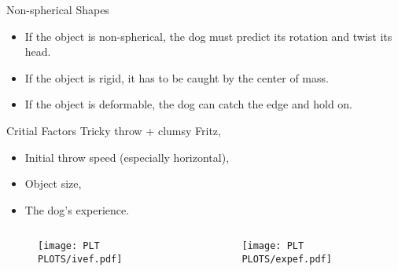 \documentclass[compress,12pt,mp]{beamer}
\begin{document}
\begin{frame}[t]{Non-spherical Shapes}
\begin{itemize}
\item If the object is non-spherical, the dog must predict its rotation and twist its head.
\item If the object is rigid, it has to be caught by the center of mass.
\item If the object is deformable, the dog can catch the edge and hold on.
\end{itemize}
\end{frame}
\begin{frame}[t]{Critial Factors}
Tricky throw + clumsy Fritz,

\begin{itemize}
\item Initial throw speed (especially horizontal),
\item Object size,
\item The dog's experience.
\end{itemize}
\begin{columns}
    \begin{column}{0.48\textwidth}
        \vspace{1cm}
        \begin{figure}
            \centering
            \texttt{[image: PLT PLOTS/ivef.pdf]}
        \end{figure}
    \end{column}
    \hfill
    \begin{column}{0.48\textwidth}
        \vspace{1cm}
        \begin{figure}
            \centering
            \texttt{[image: PLT PLOTS/expef.pdf]}
        \end{figure}
    \end{column}
\end{columns}
\end{frame}
\end{document}
